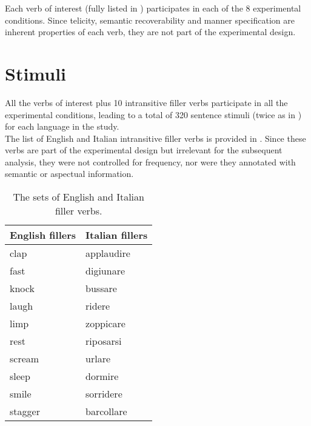 Each verb of interest (fully listed in ) participates in each of the 8 experimental conditions. Since telicity, semantic recoverability and manner specification are inherent properties of each verb, they are not part of the experimental design.

\section{Stimuli} 

All the verbs of interest plus 10 intransitive filler verbs participate in all the experimental conditions, leading to a total of 320 sentence stimuli (twice as in \textcite{Medina2007}) for each language in the study.\\
The list of English and Italian intransitive filler verbs is provided in . Since these verbs are part of the experimental design but irrelevant for the subsequent analysis, they were not controlled for frequency, nor were they annotated with semantic or aspectual information.

\begin{table}[htb] %
\caption{The sets of English and Italian filler verbs.}
\begin{tabular}{ll}
English fillers & Italian fillers \\
\hline
clap	&	applaudire	\\
fast	&	digiunare	\\
knock	&	bussare	\\
laugh	&	ridere	\\
limp	&	zoppicare	\\
rest	&	riposarsi\\
scream	&	urlare	\\
sleep	&	dormire	\\
smile	&	sorridere	\\
stagger	&	barcollare       
\end{tabular}
\end{table}

